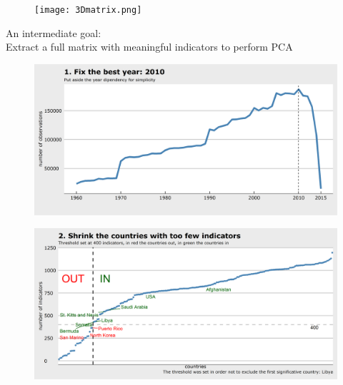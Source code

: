 \documentclass[9pt]{beamer}
\begin{document}
\begin{frame}{}
	\begin{figure}
		\centering
		\texttt{[image: 3Dmatrix.png]}
		
	\end{figure}
\end{frame}

\begin{frame}
\begin{center}
{\Large An intermediate goal:} \\[.2cm]
Extract a full matrix with meaningful indicators to perform PCA
\end{center}
\end{frame}


\begin{frame}
\begin{figure}
\centering
\includegraphics[width=\textwidth]{fix2010.png}
\end{figure}
\end{frame}

\begin{frame}
\begin{figure}
\centering
\includegraphics[width=\textwidth]{plot0005.png}
\end{figure}
\end{frame}
\end{document}
